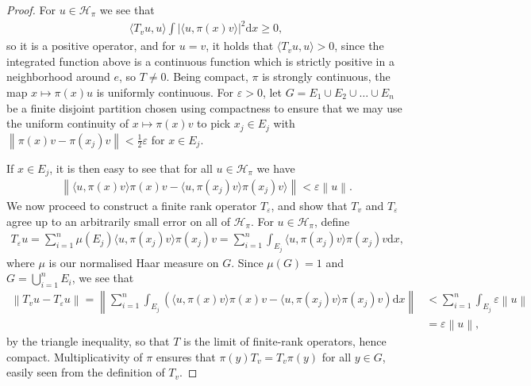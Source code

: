 \documentclass[10pt,twoside,openany,final]{memoir}
\theoremstyle{definition}
\theoremstyle{Break}
\newcommand{\lv}{\left\lVert}
\newcommand{\rv}{\right\rVert}
\renewcommand{\H}{\mathcal{H}}
\renewcommand{\d}{\mathrm{d}}
\begin{document}
\begin{proof}
For $u \in \H_\pi$ we see that
\begin{align*}
	\langle T_v u,u\rangle  \int |\langle u,\pi(x)v\rangle|^2 \d x \geq 0,
\end{align*}
so it is a positive operator, and for $u=v$, it holds that $\langle T_v u,u \rangle>0$, since the integrated function above is a continuous function which is strictly positive in a neighborhood around $e$, so $T\neq 0$. Being compact, $\pi$ is strongly continuous, the map $x \mapsto \pi(x)u$ is uniformly continuous. For $\varepsilon > 0$, let $G=E_1\cup E_2 \cup\dots \cup E_n$ be a finite disjoint partition chosen using compactness to ensure that we may use the uniform continuity of $x \mapsto \pi(x) v$ to pick $x_j \in E_j$ with $\lv \pi(x) v - \pi(x_j) v \rv < \frac{1}{2}\varepsilon$ for $x \in E_j$.

If $x \in E_j$, it is then easy to see that for all $u \in \H_\pi$ we have
\begin{align*}
	\lv \langle u , \pi(x) v \rangle \pi(x) v - \langle u , \pi(x_j)v \rangle \pi(x_j) v\rangle \rv< \varepsilon  \lv u \rv.
\end{align*}
We now proceed to construct a finite rank operator $T_\varepsilon$, and show that $T_v$ and $T_\varepsilon$ agree up to an arbitrarily small error on all of $\H_\pi$. For $u \in \H_\pi$, define
\begin{align*}
	T_\varepsilon u = \sum_{i=1}^n \mu(E_j) \langle u, \pi(x_j) v \rangle \pi(x_j) v = \sum_{i=1}^n \int_{E_j}\langle u, \pi(x_j) v \rangle \pi(x_j) v \d x,
\end{align*}
where $\mu$ is our normalised Haar measure on $G$. Since $\mu(G)=1$ and $G=\bigcup_{i=1}^n E_i$, we see that
\begin{align*}
	\lv T_v u - T_\varepsilon u \rv = \lv \sum_{i=1}^n\int_{E_j} \left(\langle u, \pi(x) v \rangle \pi(x) v - \langle u , \pi(x_j)v \rangle \pi(x_j)v\right) \d x\rv
	&< \sum_{i=1}^n \int_{E_j} \varepsilon \lv u \rv\\
	&= \varepsilon \lv u \rv,
\end{align*}
by the triangle inequality, so that $T$ is the limit of finite-rank operators, hence compact. Multiplicativity of $\pi$ ensures that $\pi(y)T_v=T_v \pi(y)$ for all $y \in G$, easily seen from the definition of $T_v$.
\end{proof}
\end{document}
